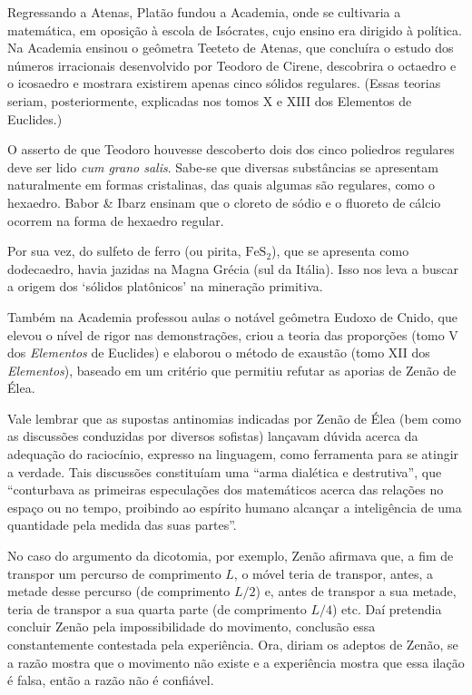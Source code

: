 \documentclass{hipatia}
\begin{document}
Regressando a Atenas, Platão fundou a Academia, onde se cultivaria a matemática, em oposição à escola de Isócrates, cujo ensino era dirigido à política. Na Academia ensinou o geômetra Teeteto de Atenas, que concluíra o estudo dos números irracionais desenvolvido por Teodoro de Cirene, descobrira o octaedro e o icosaedro e mostrara existirem apenas cinco sólidos regulares. (Essas teorias seriam, posteriormente, explicadas nos tomos X e XIII dos Elementos de Euclides.)  \cite[ p. 64]{aaboe1984}\cite[p. 172, 188]{mosterin1984}\cite[p. 147]{russell1945}

O asserto de que Teodoro houvesse descoberto dois dos cinco poliedros regulares deve ser lido \emph{cum grano salis}. Sabe-se que diversas substâncias se apresentam naturalmente em formas cristalinas, das quais algumas são regulares, como o hexaedro. Babor \& Ibarz ensinam que o cloreto de sódio e o fluoreto de cálcio ocorrem na forma de hexaedro regular. \cite[p. 84]{babor1960}

Por sua vez, do sulfeto de ferro (ou pirita, $\mathrm{FeS}_2$), que se apresenta como dodecaedro, havia jazidas na Magna Grécia (sul da Itália).  \cite[p. 41--42]{struik1987}
Isso nos leva a buscar a origem dos ‘sólidos platônicos’ na mineração primitiva. 

Também na Academia professou aulas o notável geômetra Eudoxo de Cnido, que elevou o nível de rigor nas demonstrações, criou a teoria das proporções (tomo V dos \emph{Elementos} de Euclides) e elaborou o método de exaustão (tomo XII dos \emph{Elementos}), baseado em um critério que permitiu refutar as aporias de Zenão de Élea.   \cite[p. 64]{aaboe1984}\cite[p. 175]{mosterin1984}

Vale lembrar que as supostas antinomias indicadas por Zenão de Élea  (bem como as discussões conduzidas por diversos sofistas)  lançavam dúvida acerca da adequação do raciocínio, expresso na linguagem, como ferramenta para se atingir a verdade. Tais discussões constituíam uma ``arma dialética e destrutiva'', que ``conturbava as primeiras especulações dos matemáticos acerca das relações no espaço ou no tempo, proibindo ao espírito humano alcançar a inteligência de uma quantidade pela medida das suas partes''. \cite[p. 154]{brunschvicg1972} 

No caso do argumento da dicotomia, por exemplo, Zenão afirmava que, a fim de transpor um percurso de comprimento $L$, o móvel teria de transpor, antes, a metade desse percurso (de comprimento $L/2$) e, antes de transpor a sua metade, teria de transpor a sua quarta parte (de comprimento $L/4$) etc. Daí pretendia concluir Zenão pela impossibilidade do movimento, conclusão essa constantemente contestada pela experiência. Ora, diriam os adeptos de Zenão, se a razão mostra que o movimento não existe e a experiência mostra que essa ilação é falsa, então a razão não é confiável.
\end{document}
